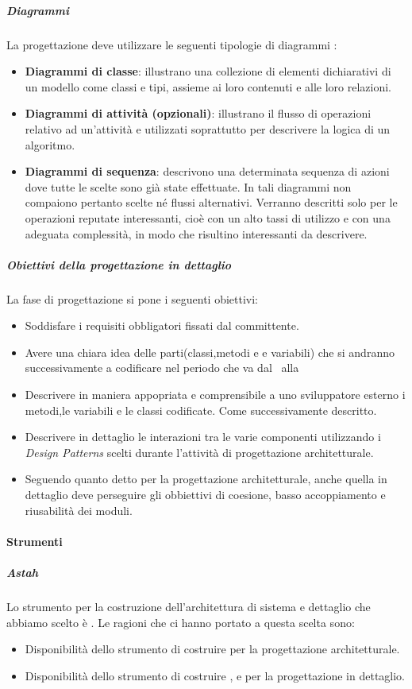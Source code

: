 \subparagraph{Diagrammi}
La progettazione deve utilizzare le seguenti tipologie di diagrammi :
\begin{itemize}
\item
\textbf{Diagrammi di classe}: illustrano una collezione di elementi dichiarativi di un modello come classi e tipi, assieme ai loro contenuti e alle loro relazioni.
\item
\textbf{Diagrammi di attività (opzionali)}: illustrano il flusso di operazioni relativo ad un'attività e utilizzati soprattutto per descrivere la logica di un algoritmo.
\item
\textbf{Diagrammi di sequenza}: descrivono una determinata sequenza di azioni dove tutte le scelte sono già state effettuate. In tali diagrammi non compaiono pertanto scelte né flussi alternativi. Verranno descritti solo per le operazioni reputate interessanti, cioè con un alto tassi di utilizzo e con una adeguata complessità, in modo che risultino interessanti da descrivere.
\end{itemize}

\subparagraph{Obiettivi della progettazione in dettaglio}
La fase di progettazione si pone i seguenti obiettivi:
\begin{itemize}
\item Soddisfare i requisiti obbligatori fissati dal committente.
\item Avere una chiara idea delle parti(classi,metodi e e variabili) che si andranno successivamente a codificare nel periodo che va dal \RP\ alla \RQ
\item Descrivere in maniera appopriata e comprensibile a uno sviluppatore esterno i metodi,le variabili e le classi codificate. Come successivamente descritto.
\item Descrivere in dettaglio le interazioni tra le varie componenti utilizzando i \textit{Design Patterns} scelti durante l'attività di progettazione architetturale.
\item Seguendo quanto detto per la progettazione architetturale, anche quella in dettaglio deve perseguire gli obbiettivi di coesione, basso accoppiamento e riusabilità dei moduli.
\end{itemize}

\paragraph{Strumenti}

\subparagraph{Astah}
Lo strumento per la costruzione dell'architettura di sistema e dettaglio che abbiamo scelto è .
Le ragioni che ci hanno portato a questa scelta sono:
\begin{itemize}
\item Disponibilità dello strumento di costruire  per la progettazione architetturale.
\item Disponibilità dello strumento di costruire ,  e  per la progettazione in dettaglio.
\end{itemize}

